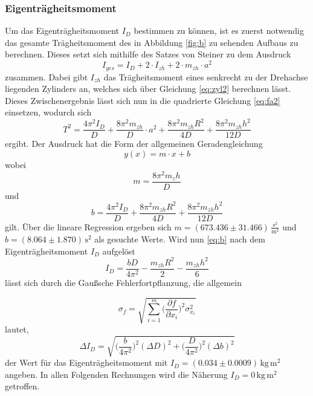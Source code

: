\subsubsection{Eigenträgheitsmoment}

Um das Eigenträgheitsmoment $I_D$ bestimmen zu können, ist es zuerst notwendig das gesamte 
Trägheitsmoment des in Abbildung \ref{fig:b} zu sehenden Aufbaus zu berechnen. Dieses setzt 
sich mithilfe des Satzes von Steiner zu dem Ausdruck
\begin{equation}
    I_{ges} = I_D + 2\cdot I_{zh} + 2\cdot m_{zh} \cdot a^2
\end{equation}
\noindent
zusammen. Dabei gibt $I_{zh}$ das Trägheitsmoment eines senkrecht zu der Drehachse liegenden Zylinders an, 
welches sich über Gleichung \ref{eq:zyl2} berechnen lässt. Dieses Zwischenergebnis lässt sich
nun in die quadrierte Gleichung \ref{eq:fa2} einsetzen, wodurch sich 
\begin{equation}
    T^2 = \frac{4 \pi^2 I_D}{D} + \frac{8 \pi^2 m_{zh}}{D} \cdot a^2 + \frac{8 \pi^2 m_{zh} R^2}{4 D} + \frac{8 \pi^2 m_{zh} h^2}{12 D} 
\end{equation}
\noindent 
ergibt. Der Ausdruck hat die Form der allgemeinen Geradengleichung
\begin{equation}
    y(x) = m\cdot x + b
\end{equation}
\noindent
wobei 
\begin{equation}
    m = \frac{8 \pi^2 m_zh}{D}
\end{equation}
und 
\begin{equation}
    b = \frac{4 \pi^2 I_D}{D} + \frac{8 \pi^2 m_{zh} R^2}{4 D} + \frac{8 \pi^2 m_{zh} h^2}{12 D}
    \label{eq:b}
\end{equation}
gilt. Über die lineare Regression ergeben sich $m = (673.436 \pm 31.466)\,\frac{\si{\second\squared}}{\si{\meter\squared}}$ und $b = (8.064 \pm 1.870)\,\si{\second}^2$ als gesuchte Werte.
Wird nun \ref{eq:b} nach dem Eigenträgheitsmoment $I_D$ aufgelöst
\begin{equation}
    I_D = \frac{b D}{4 \pi^2} - \frac{m_{zh} R^2}{2} - \frac{m_{zh} h^2}{6}
\end{equation}
\noindent
lässt sich durch die Gaußsche Fehlerfortpflanzung, die allgemein

\begin{equation}
    \sigma_f = \sqrt{\sum_{i=1}^m   \Big(   \frac{\partial f}{\partial x_i} \Big)^2 \sigma_{x_{i}}^2       }
    \label{eq:gauss}
\end{equation}
\noindent
lautet,  
\begin{equation}
    \Delta I_D = \sqrt{\Big(\frac{b}{4\pi^2}\Big)^2 (\Delta D)^2 + \Big(\frac{D}{4\pi^2}\Big)^2(\Delta b)^2}
\end{equation}
\noindent
der Wert für das Eigenträgheitsmoment mit $I_D = (0.034 \pm 0.0009)\, \si{\kilogram}\,\si{\meter\squared}$ 
angeben. In allen Folgenden Rechnungen wird die Näherung $I_D = 0\, \si{\kilogram}\,\si{\meter\squared}$
getroffen.

